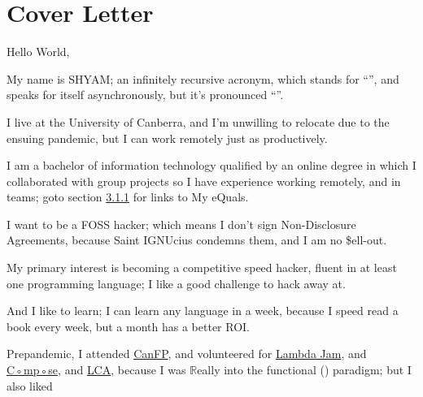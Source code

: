 \documentclass[12pt,a4paper,oneside]{article}
\newcommand{\sh}[1]{{\color{gray}{#1}}}
\begin{document}
\section{Cover Letter}
Hello World,
\smallskip\\\par{}My name is SHYAM; an infinitely recursive acronym, which stands for ``\sh{SHYAM Has Your Anomaly Mitigated}'', and speaks for itself asynchronously, but it's pronounced ``\sh{Sharm}''.%
\par{}I live at the University of Canberra, and I'm unwilling to relocate due to the ensuing pandemic, but I can work remotely just as productively.
\par{}I am a bachelor of information technology qualified by an online degree in which I collaborated with group projects so I have experience working remotely, and in teams; goto section \hyperref[sec:bit]{3.1.1} for links to My eQuals.
\\\par{}I want to be a FOSS hacker; which means I don't sign Non-Disclosure Agreements, because Saint IGNUcius condemns them, and I am no \$ell-out.
\par{}My primary interest is becoming a competitive speed hacker, fluent in at least one programming language; I like a good challenge to hack away at.
\par{}And I like to learn; I can learn any language in a week, because I speed read a book every week, but a month has a better ROI.
\\\par{}Prepandemic, I attended \href{https://www.meetup.com/CanFPG/}{CanFP}, and volunteered for \href{http://lambdajam.yowconference.com.au/}{Lambda Jam}, and \href{http://www.composeconference.org/}{C◦mp◦se}, and \href{https://linux.conf.au/}{LCA}, because I was $\mathbb{R}$eally into the functional (\sh{Haskell}) paradigm; but I also liked
\end{document}
